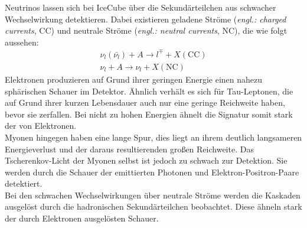Neutrinos lassen sich bei IceCube über die Sekundärteilchen aus schwacher Wechselwirkung detektieren. Dabei existieren geladene Ströme (\textit{engl.: charged currents}, CC) und neutrale Ströme (\textit{engl.: neutral currents}, NC), die wie folgt aussehen:\\
\begin{align}
	\nu_{l}(\bar{\nu_{l}}) + A \to l^{\mp} + X (\text{CC})\\
	\nu_{l} + A \to \nu_{l} + X (\text{NC})
\end{align}
Elektronen produzieren auf Grund ihrer geringen Energie einen nahezu sphärischen Schauer im Detektor. Ähnlich verhält es sich für Tau-Leptonen, die auf Grund ihrer kurzen Lebensdauer auch nur eine geringe Reichweite haben, bevor sie zerfallen. Bei nicht zu hohen Energien ähnelt die Signatur somit stark der von Elektronen. \\
Myonen hingegen haben eine lange Spur, dies liegt an ihrem deutlich langsameren Energieverlust und der daraus resultierenden großen Reichweite. Das Tscherenkov-Licht der Myonen selbst ist jedoch zu schwach zur Detektion. Sie werden durch die Schauer der emittierten Photonen und Elektron-Positron-Paare detektiert.\\
Bei den schwachen Wechselwirkungen über neutrale Ströme werden die Kaskaden ausgelöst durch die hadronischen Sekundärteilchen beobachtet. Diese ähneln stark der durch Elektronen ausgelösten Schauer.

